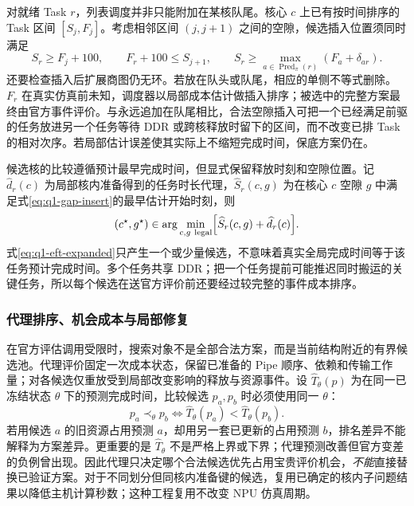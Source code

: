 对就绪 Task $r$，列表调度并非只能附加在某核队尾。核心 $c$ 上已有按时间排序的 Task 区间 $[S_j,F_j]$。考虑相邻区间 $(j,j+1)$ 之间的空隙，候选插入位置须同时满足
\begin{equation}\label{eq:q1-gap-insert}
S_r\ge F_j+100,\qquad
F_r+100\le S_{j+1},\qquad
S_r\ge \max_{a\in\operatorname{Pred}_\pi(r)}(F_a+\delta_{ar}).
\end{equation}
还要检查插入后扩展商图仍无环。若放在队头或队尾，相应的单侧不等式删除。$F_r$ 在真实仿真前未知，调度器以局部成本估计做插入排序；被选中的完整方案最终由官方事件评价。与永远追加在队尾相比，合法空隙插入可把一个已经满足前驱的任务放进另一个任务等待 DDR 或跨核释放时留下的区间，而不改变已排 Task 的相对次序。若局部估计误差使其实际上不缩短完成时间，保底方案仍在。

候选核的比较遵循预计最早完成时间，但显式保留释放时刻和空隙位置。记 $\widehat d_r(c)$ 为局部核内准备得到的任务时长代理，$\widehat S_r(c,g)$ 为在核心 $c$ 空隙 $g$ 中满足式\eqref{eq:q1-gap-insert}的最早估计开始时刻，则
\begin{equation}\label{eq:q1-eft-expanded}
(c^\star,g^\star)\in
\arg\min_{c,g\ {\rm legal}}
\Bigl[\widehat S_r(c,g)+\widehat d_r(c)\Bigr].
\end{equation}
式\eqref{eq:q1-eft-expanded}只产生一个或少量候选，不意味着真实全局完成时间等于该任务预计完成时间。多个任务共享 DDR；把一个任务提前可能推迟同时搬运的关键任务，所以每个候选在送官方评价前还要经过较完整的事件成本排序。

\subsubsection{代理排序、机会成本与局部修复}
在官方评估调用受限时，搜索对象不是全部合法方案，而是当前结构附近的有界候选池。代理评价固定一次成本状态，保留已准备的 Pipe 顺序、依赖和传输工作量；对各候选仅重放受到局部改变影响的释放与资源事件。设 $\widehat T_{\theta}(p)$ 为在同一已冻结状态 $\theta$ 下的预测完成时间，比较候选 $p_a,p_b$ 时必须使用同一 $\theta$：
\begin{equation}\label{eq:q1-proxy-comparison}
p_a\prec_{\theta}p_b
\iff
\widehat T_\theta(p_a)<\widehat T_\theta(p_b).
\end{equation}
若用候选 $a$ 的旧资源占用预测 $a$，却用另一套已更新的占用预测 $b$，排名差异不能解释为方案差异。更重要的是 $\widehat T_\theta$ 不是严格上界或下界；代理预测改善但官方变差的负例曾出现。因此代理只决定哪个合法候选优先占用宝贵评价机会，\emph{不能}直接替换已验证方案。对于不同划分但同核内准备键的候选，复用已确定的核内子问题结果以降低主机计算秒数；这种工程复用不改变 NPU 仿真周期。

